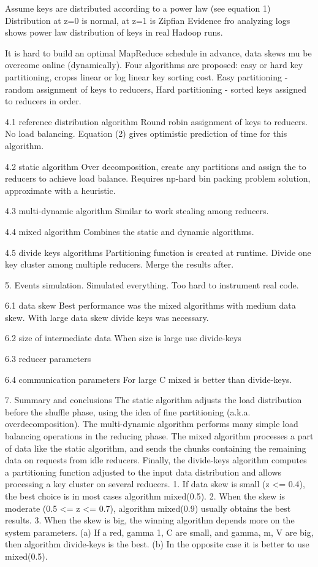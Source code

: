 \documentclass{article}
\begin{document}
Assume keys are distributed according to a power law (see equation 1)
Distribution at z=0 is normal, at z=1 is Zipfian
Evidence fro analyzing logs shows power law distribution of keys in real Hadoop runs.

It is hard to build an optimal MapReduce schedule in advance, data skews mu be overcome online (dynamically).
Four algorithms are proposed: easy or hard key partitioning, cropss linear or log linear key sorting cost.
Easy partitioning - random assignment of keys to reducers,
Hard partitioning - sorted keys assigned to reducers in order.

4.1 reference distribution algorithm
Round robin assignment of keys to reducers.
No load balancing.
Equation (2) gives optimistic prediction of time for this algorithm.

4.2 static algorithm
Over decomposition, create any partitions and assign the to reducers to achieve load balance.
Requires np-hard bin packing problem solution, approximate with a heuristic.

4.3 multi-dynamic algorithm
Similar to work stealing among reducers.

4.4 mixed algorithm
Combines the static and dynamic algorithms.

4.5 divide keys algorithms
Partitioning function is created at runtime.
Divide one key cluster among multiple reducers.
Merge the results after.

5. Events simulation.
Simulated everything.  Too hard to instrument real code.

6.1 data skew
Best performance was the mixed algorithms with medium data skew.
With large data skew divide keys was necessary.

6.2 size of intermediate data
When size is large use divide-keys

6.3 reducer parameters

6.4 communication parameters
For large C mixed is better than divide-keys.

7. Summary and conclusions
The static algorithm adjusts the load distribution before the shuffle phase, using the idea of fine partitioning (a.k.a. overdecomposition). The multi-dynamic algorithm performs many simple load balancing operations in the reducing phase. The mixed algorithm processes a part of data like the static algorithm, and sends the chunks containing the remaining data on requests from idle reducers. Finally, the divide-keys algorithm computes a partitioning function adjusted to the input data distribution and allows processing a key cluster on several reducers. 
1. If data skew is small (z <= 0.4), the best choice is in most cases algorithm mixed(0.5). 2. When the skew is moderate (0.5 <= z <= 0.7), algorithm mixed(0.9) usually obtains the best results. 3. When the skew is big, the winning algorithm depends more on the system parameters. 
(a) If a red, gamma 1, C are small, and gamma, m, V are big, then algorithm divide-keys is the best. (b) In the opposite case it is better to use mixed(0.5). 
\end{document}
